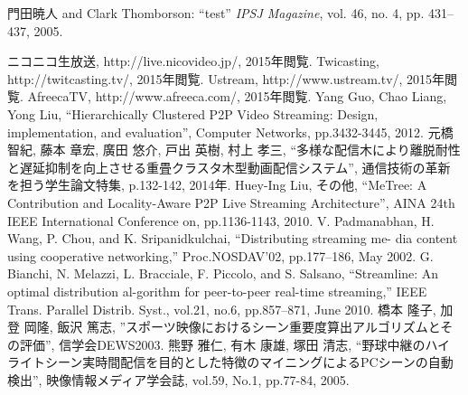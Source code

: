%
%
\begin{thebibliography}{99}

門田暁人 and Clark Thomborson:
``test''
{\it IPSJ Magazine}, vol. 46, no. 4, pp. 431--437, 2005.

  ニコニコ生放送, http://live.nicovideo.jp/, 2015年閲覧.
  Twicasting, http://twitcasting.tv/, 2015年閲覧.
  Ustream, http://www.ustream.tv/, 2015年閲覧.
  AfreecaTV, http://www.afreeca.com/, 2015年閲覧.
  Yang Guo, Chao Liang, Yong Liu, “Hierarchically Clustered P2P Video Streaming: Design, implementation, and evaluation”, Computer Networks, pp.3432-3445, 2012.
  元橋 智紀, 藤本 章宏, 廣田 悠介, 戸出 英樹, 村上 孝三, “多様な配信木により離脱耐性と遅延抑制を向上させる重畳クラスタ木型動画配信システム”, 通信技術の革新を担う学生論文特集, p.132-142, 2014年.
  Huey-Ing Liu, その他, “MeTree: A Contribution and Locality-Aware P2P Live Streaming Architecture”, AINA 24th IEEE International Conference on, pp.1136-1143, 2010.
  V. Padmanabhan, H. Wang, P. Chou, and K. Sripanidkulchai, “Distributing streaming me-
dia content using cooperative networking,” Proc.NOSDAV’02, pp.177–186, May 2002.
  G. Bianchi, N. Melazzi, L. Bracciale, F. Piccolo, and S. Salsano, “Streamline: An optimal distribution al-gorithm for peer-to-peer real-time streaming,” IEEE Trans. Parallel Distrib. Syst., vol.21, no.6, pp.857–871, June 2010.
  橋本 隆子, 加登 岡隆, 飯沢 篤志, ”スポーツ映像におけるシーン重要度算出アルゴリズムとその評価”, 信学会DEWS2003.
  熊野 雅仁, 有木 康雄, 塚田 清志, “野球中継のハイライトシーン実時間配信を目的とした特徴のマイニングによるPCシーンの自動検出”, 映像情報メディア学会誌, vol.59, No.1, pp.77-84, 2005.


\end{thebibliography}
